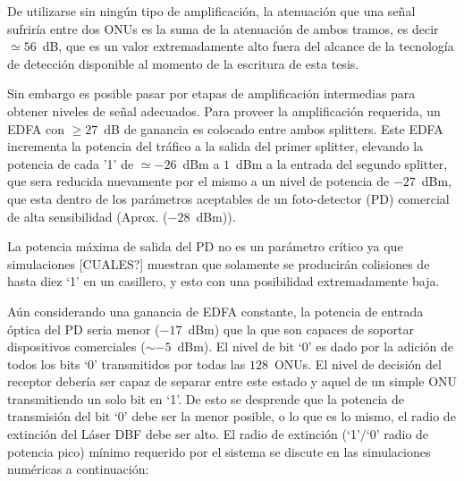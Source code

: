 De utilizarse sin ningún tipo de amplificación, la atenuación que una señal sufriría entre dos ONUs es la suma de la atenuación de ambos tramos, es decir $\simeq56$~dB, que es un valor extremadamente alto fuera del alcance de la tecnología de detección disponible al momento de la escritura de esta tesis.

Sin embargo es posible pasar por etapas de amplificación intermedias para obtener niveles de señal adecuados. Para proveer la amplificación requerida, un EDFA con $\geq27$~dB de ganancia es colocado entre ambos splitters. Este EDFA incrementa la potencia del tráfico a la salida del primer splitter, elevando la potencia de cada '1' de $\simeq-26$~dBm a $1$~dBm a la entrada del segundo splitter, que sera reducida nuevamente por el mismo a un nivel de potencia de $-27$~dBm, que esta dentro de los parámetros aceptables de un foto-detector (PD) comercial de alta sensibilidad (Aprox. ($-28$~dBm)).

La potencia máxima de salida del PD no es un parámetro crítico ya que simulaciones [CUALES?] muestran que solamente se producirán colisiones de hasta diez `1' en un casillero, y esto con una posibilidad extremadamente baja.

Aún considerando una ganancia de EDFA constante, la potencia de entrada óptica del PD seria menor ($-17$~dBm) que la que son capaces de soportar dispositivos comerciales ($\sim -5$~dBm).
El nivel de bit `0' es dado por la adición de todos los bits `0' transmitidos por todas las $128$~ONUs.
El nivel de decisión del receptor debería ser capaz de separar entre este estado y aquel de un simple ONU transmitiendo un solo bit en `1'.
De esto se desprende que la potencia de transmisión del bit `0' debe ser la menor posible, o lo que es lo mismo, el radio de extinción del Láser DBF debe ser alto.
El radio de extinción (`1'$/$`0' radio de potencia pico) mínimo requerido por el sistema se discute en las simulaciones numéricas a continuación:


